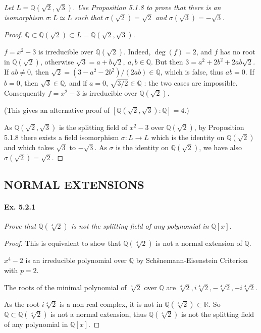 \documentclass[11pt,a4paper]{article}
\newcommand{\Q}{\mathbb{Q}}
\newcommand{\R}{\mathbb{R}}
\begin{document}
{\it Let $L = \Q(\sqrt{2},\sqrt{3})$. Use Proposition 5.1.8 to prove that there is an isomorphism $\sigma : L \simeq L$ such that $\sigma(\sqrt{2}) = \sqrt{2}$ and $\sigma(\sqrt{3}) = - \sqrt{3}$.
}

\begin{proof}
$\Q \subset \Q(\sqrt{2}) \subset L = \Q(\sqrt{2},\sqrt{3})$.

$f=x^2 - 3$ is irreducible over $\Q(\sqrt{2})$. Indeed, $\deg(f) = 2$, and $f$ has no root in  $\Q(\sqrt{2})$, otherwise $\sqrt{3}  = a + b \sqrt{2}, \ a,b \in \Q$. But then $3 = a^2+2b^2 + 2ab \sqrt{2}$. If $ab \neq 0$, then $\sqrt{2} = (3-a^2-2b^2)/(2ab) \in \Q$, which is false, thus $ab = 0$. If $b=0$, then $\sqrt{3} \in \Q$, and if  $a = 0$, $\sqrt{3/2} \in \Q$ : the two cases are impossible. Consequently $f=x^2 - 3$ is irreducible over $\Q(\sqrt{2})$.

(This gives an alternative proof of $ [\Q(\sqrt{2},\sqrt{3}):\Q] = 4$.)


As $\Q(\sqrt{2},\sqrt{3})$ is the splitting field of $x^2-3$ over $\mathbb{Q}(\sqrt{2})$, by Proposition 5.1.8 there exists a field isomorphism $\sigma : L\to L$ which is the identity on $\Q(\sqrt{2})$ and which takes $\sqrt{3}$ to $-\sqrt{3}$. As $\sigma$ is the identity on $\Q(\sqrt{2})$, we have also $\sigma(\sqrt{2}) = \sqrt{2}$.
\end{proof}

\subsection{NORMAL EXTENSIONS}
\paragraph{Ex. 5.2.1}

{\it Prove that $\Q(\sqrt[4]{2})$ is not the splitting field of any polynomial in $\Q[x]$.
}

\begin{proof}
This is equivalent to show that $\Q(\sqrt[4]{2})$ is not a normal extension of $\Q$.

$x^4 - 2$ is an irreducible polynomial over $\Q$ by Schšnemann-Eisenstein Criterion with $p=2$.

The roots of the minimal polynomial of $\sqrt[4]{2}$ over $\Q$ are $\sqrt[4]{2}, i \sqrt[4]{2},-\sqrt[4]{2},-i\sqrt[4]{2}$.

As the root $i \sqrt[4]{2}$ is a non real complex, it is not in $\Q(\sqrt[4]{2})\subset \R$. So $\Q \subset \Q(\sqrt[4]{2})$ is not a normal extension, thus $\Q(\sqrt[4]{2})$ is not the splitting field of any polynomial in $\Q[x]$.
\end{proof}
\end{document}
